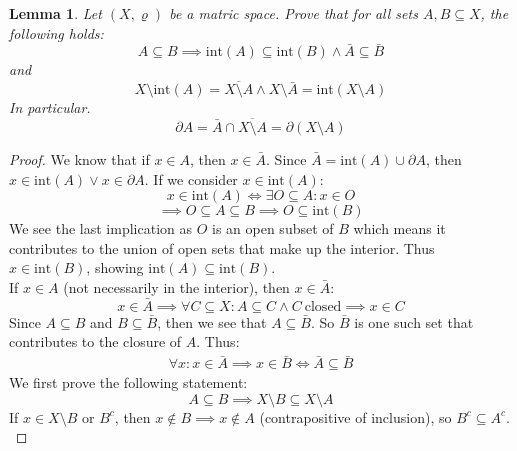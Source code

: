 \documentclass{article}
\newtheorem{lem}{Lemma}[section]
\begin{document}
\medskip
\begin{lem}
Let $(X, \varrho)$ be a matric space. Prove that for all sets $A, B \subseteq X$, the following holds:
\begin{equation*}
    A \subseteq B \implies \text{int}(A) \subseteq \text{int}(B) \land \bar{A} \subseteq \bar{B}
\end{equation*}
and
\begin{equation*}
    X \setminus \text{int}(A) = \overline{X \setminus A} \land X \setminus \bar{A} = \text{int}(X \setminus A)
\end{equation*}
In particular.
\begin{equation*}
    \partial A = \bar{A} \cap \overline{X \setminus A} = \partial(X \setminus A)
\end{equation*}
\end{lem}
\begin{proof} We know that if $x \in A$, then $x \in \bar{A}$. Since $\bar{A} = \text{int}(A) \cup \partial A$, then $x \in \text{int}(A) \lor x \in \partial A$. If we consider $x \in \text{int}(A)$:
\begin{equation*}
    x \in \text{int}(A) \iff \exists O \subseteq A: x \in O
\end{equation*}
\begin{equation*}
    \implies O \subseteq A \subseteq B \implies O \subseteq \text{int}(B)
\end{equation*}
We see the last implication as $O$ is an open subset of $B$ which means it contributes to the union of open sets that make up the interior. Thus $x \in \text{int}(B)$, showing $\text{int}(A) \subseteq \text{int}(B)$.\\

If $x \in A$ (not necessarily in the interior), then $x \in \bar{A}$:
\begin{equation*}
    x \in \bar{A} \implies \forall C \subseteq X: A \subseteq C \land C \ \text{closed} \implies x \in C
\end{equation*}
Since $A \subseteq B$ and $B \subseteq \bar{B}$, then we see that $A \subseteq \bar{B}$. So $\bar{B}$ is one such set that contributes to the closure of $A$. Thus:
\begin{eqnarray}
    \forall x: x \in \bar{A} \implies x \in \bar{B} \iff \bar{A} \subseteq \bar{B}
\end{eqnarray}
We first prove the following statement:
\begin{equation*}
    A \subseteq B \implies X \setminus B \subseteq X \setminus A
\end{equation*}
If $x \in X \setminus B$ or $B^c$, then $x \notin B \implies x \notin A$ (contrapositive of inclusion), so $B^c \subseteq A^c$.\\


\end{proof}
\end{document}
